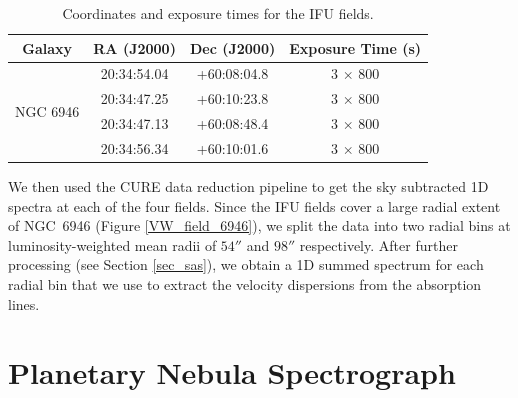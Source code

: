 \documentclass[fleqn,usenatbib]{mnras}
\begin{document}
\begin{table} %
\centering
\begin{tabular}{c c c c}
\hline 
Galaxy & RA (J2000) & Dec (J2000) & Exposure Time (s) \\
\hline
\multirow{4}{*}{NGC 6946} & 20:34:54.04                                    & +60:08:04.8                                      & 3 $\times$ 800                                                 \\
& 20:34:47.25                                      & +60:10:23.8                                    & 3 $\times$ 800                                                 \\
& 20:34:47.13                                      & +60:08:48.4                                       & 3 $\times$ 800                                                 \\
& 20:34:56.34                                    & +60:10:01.6                                     & 3 $\times$ 800                                                 \\     
\hline 
\end{tabular}
\caption{Coordinates and exposure times for the IFU fields.}
\label{VW_pos_6946}
\end{table}

We then used the CURE data reduction pipeline \citep{cure} to get the sky subtracted 1D %
spectra at each of the four fields. Since the IFU fields cover a large radial extent of NGC~6946 (Figure \ref{VW_field_6946}), we split the data into two radial bins at luminosity-weighted mean radii of $54''$ and $98''$ respectively. After further processing (see Section \ref{sec_sas}), we obtain a 1D summed spectrum for each radial bin that we use to extract the velocity dispersions from the absorption lines.

\section{Planetary Nebula Spectrograph}
\end{document}
